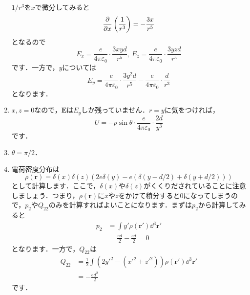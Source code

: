 \documentclass[a4paper,pdflatex,ja=standard]{bxjsarticle}
\begin{document}
\begin{enumerate}
  $1/r^3$を$x$で微分してみると
  \begin{equation}
    \pdv{}{x}\left(\frac{1}{r^3}\right)
    =
    -\frac{3x}{r^5}
  \end{equation}
  となるので
  \begin{equation}
    E_x
    =
    \frac{e}{4\pi\varepsilon_0}
    \cdot
    \frac{3xyd}{r^5}
    ,\ 
    E_z
    =
    \frac{e}{4\pi\varepsilon_0}
    \cdot
    \frac{3yzd}{r^5}
  \end{equation}
  です．一方で，$y$については
  \begin{equation}
    E_y
    =
    \frac{e}{4\pi\varepsilon_0}
    \cdot
    \frac{3y^2d}{r^5}
    -
    \frac{e}{4\pi\varepsilon_0}
    \cdot
    \frac{d}{r^3}
  \end{equation}
  となります．


  \item

  $x,z=0$なので，$\bm{E}$は$E_y$しか残っていません．$r=y$に気をつければ，
  \begin{equation}
    U
    =
    -
    p\sin\theta
    \cdot
    \frac{e}{4\pi\varepsilon_0}
    \cdot
    \frac{2d}{y^3}
  \end{equation}
  です．


  \item 

  $\theta=\pi/2$．


  \item 

  電荷密度分布は
  \begin{equation}
    \rho(\bm{r})
    =
    \delta(x)\delta(z)
    \left(  
      2e\delta(y)
      -
      e(\delta(y-d/2)+\delta(y+d/2))
    \right)
  \end{equation}
  として計算します．ここで，$\delta(x)$や$\delta(z)$がくくりだされていることに注意しましょう．つまり，$\rho(\bm{r})$に$x$や$z$をかけて積分すると$0$になってしまうので，$p_2$や$Q_{22}$のみを計算すればよいことになります．まずは$p_2$から計算してみると
  \begin{align}
    p_2
    &=
    \int
    y'\rho(\bm{r}')\dd^3 \bm{r}'
    \nonumber
    \\
    &=
    \frac{ed}{2}-\frac{ed}{2}
    =
    0
  \end{align}
  となります．一方で，$Q_{22}$は
  \begin{align}
    Q_{22}
    &=
    \frac{1}{2}
    \int
    (2{y'}^2-({x'}^2+{z'}^2))
    \rho(\bm{r}')
    \dd^3 \bm{r}'
    \nonumber
    \\
    &=
    -\frac{ed^2}{2}
  \end{align}
  です．



\end{enumerate}
\end{document}
